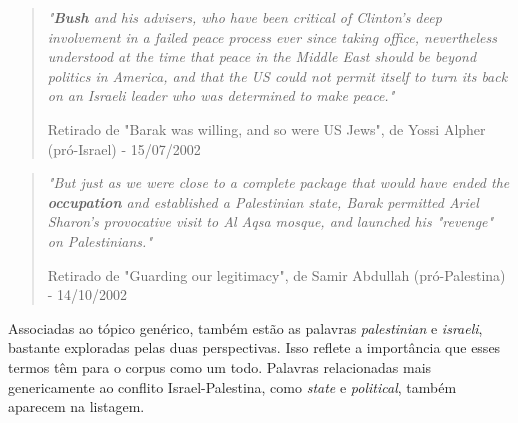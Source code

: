 




\begin{quote}
\emph{"\textbf{Bush} and his advisers, who have been critical of Clinton's deep involvement
in a failed peace process ever since taking office, nevertheless
understood at the time that peace in the Middle East should be beyond
politics in America, and that the US could not permit itself to turn its
back on an Israeli leader who was determined to make peace."} 

{\small Retirado de "Barak was willing, and so were US Jews", de Yossi Alpher (pró-Israel) - 15/07/2002}
\end{quote}

\begin{quote}
\emph{"But just as we were close to a complete
package that would have ended the \textbf{occupation} and established a
Palestinian state, Barak permitted Ariel Sharon's provocative visit to
Al Aqsa mosque, and launched his "revenge" on Palestinians."} 

{\small Retirado de "Guarding our legitimacy", de Samir Abdullah (pró-Palestina) - 14/10/2002}
\end{quote}

Associadas ao tópico genérico, também estão as palavras \emph{palestinian} e \emph{israeli}, bastante exploradas pelas duas perspectivas. Isso reflete a importância que esses termos têm para o corpus como um todo. Palavras relacionadas mais genericamente ao conflito Israel-Palestina, como \emph{state} e \emph{political}, também aparecem na listagem. %




